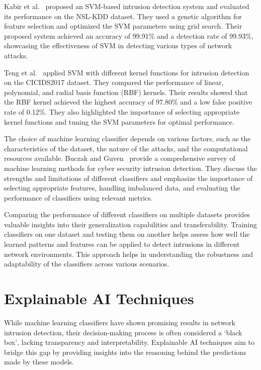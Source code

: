 Kabir et al.~\cite{kabir2017network} proposed an SVM-based intrusion detection system and evaluated its performance on the NSL-KDD dataset. They used a genetic algorithm for feature selection and optimized the SVM parameters using grid search. Their proposed system achieved an accuracy of 99.91\% and a detection rate of 99.93\%, showcasing the effectiveness of SVM in detecting various types of network attacks.

Teng et al.~\cite{teng2017svm} applied SVM with different kernel functions for intrusion detection on the CICIDS2017 dataset. They compared the performance of linear, polynomial, and radial basis function (RBF) kernels. Their results showed that the RBF kernel achieved the highest accuracy of 97.80\% and a low false positive rate of 0.12\%. They also highlighted the importance of selecting appropriate kernel functions and tuning the SVM parameters for optimal performance.

The choice of machine learning classifier depends on various factors, such as the characteristics of the dataset, the nature of the attacks, and the computational resources available. Buczak and Guven~\cite{buczak2015survey} provide a comprehensive survey of machine learning methods for cyber security intrusion detection. They discuss the strengths and limitations of different classifiers and emphasize the importance of selecting appropriate features, handling imbalanced data, and evaluating the performance of classifiers using relevant metrics.

Comparing the performance of different classifiers on multiple datasets provides valuable insights into their generalization capabilities and transferability. Training classifiers on one dataset and testing them on another helps assess how well the learned patterns and features can be applied to detect intrusions in different network environments. This approach helps in understanding the robustness and adaptability of the classifiers across various scenarios.

\section{Explainable AI Techniques}\label{sec:explainable}

While machine learning classifiers have shown promising results in network intrusion detection, their decision-making process is often considered a `black box', lacking transparency and interpretability. Explainable AI techniques aim to bridge this gap by providing insights into the reasoning behind the predictions made by these models.

